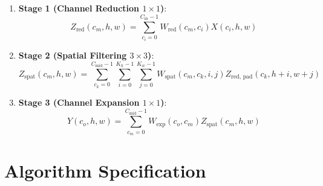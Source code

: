 \documentclass[11pt,a4paper]{article}
\theoremstyle{definition}
\begin{document}
\begin{enumerate}
    \item \textbf{Stage 1 (Channel Reduction $1 \times 1$)}:
    \begin{equation}
    Z_{\text{red}}(c_m, h, w) = \sum_{c_i=0}^{C_{\text{in}}-1} W_{\text{red}}(c_m, c_i) X(c_i, h, w)
    \end{equation}
    \item \textbf{Stage 2 (Spatial Filtering $3 \times 3$)}:
    \begin{equation}
    Z_{\text{spat}}(c_m, h, w) = \sum_{c_k=0}^{C_{\text{mid}}-1} \sum_{i=0}^{K_h-1} \sum_{j=0}^{K_w-1} W_{\text{spat}}(c_m, c_k, i, j) Z_{\text{red, pad}}(c_k, h + i, w + j)
    \end{equation}
    \item \textbf{Stage 3 (Channel Expansion $1 \times 1$)}:
    \begin{equation}
    Y(c_o, h, w) = \sum_{c_m=0}^{C_{\text{mid}}-1} W_{\text{exp}}(c_o, c_m) Z_{\text{spat}}(c_m, h, w)
    \end{equation}
\end{enumerate}

\section{Algorithm Specification}
\end{document}
